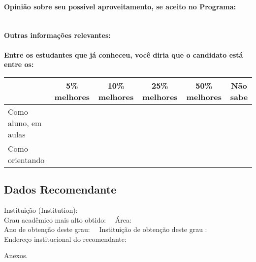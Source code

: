 \documentclass[11pt]{article}
\begin{document}
\\
\textbf{Opinião sobre seu possível aproveitamento, se aceito no Programa:}
\\\\ 
\\
\textbf{Outras informações relevantes:} \\
\\[0.3cm]
\textbf{Entre os estudantes que já conheceu, você diria que o candidato está entre os:}
\\
\begin{tabular}{|l|c|c|c|c|c|}
\hline
 & 5\% melhores & 10\% melhores & 25\% melhores & 50\% melhores & Não sabe \\
\hline
Como aluno, em aulas &  &  &  &  & \\
\hline
Como orientando &  &  &  &  & \\
\hline
\end{tabular}
\subsection*{Dados Recomendante} 
	Instituição (Institution): 
\\ 
	Grau acadêmico mais alto obtido: 
	\ \ Área: 
	\\
	Ano de obtenção deste grau: 
	\ \ 
	Instituição de obtenção deste grau : 
	\\ 
	Endereço institucional do recomendante: \\  
\begin{center}
Anexos.
\end{center}
\end{document}
